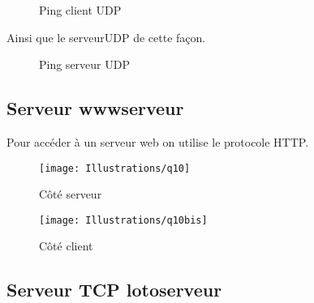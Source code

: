 \documentclass[paper=a4, fontsize=12pt]{article}
\numberwithin{equation}{section}		%
\numberwithin{figure}{section}			%
\numberwithin{table}{section}				%
\begin{document}
\begin{figure}[h!]
\caption{\label{Illustrations/decoupage_etapes_2}Ping client UDP}
\end{figure}
Ainsi que le serveurUDP de cette façon.
\begin{figure}[h!]
\caption{\label{Illustrations/decoupage_etapes_2}Ping serveur UDP}
\end{figure}

\subsection{Serveur wwwserveur}
Pour accéder à un serveur web on utilise le protocole HTTP.
\begin{figure}[h!]
\centerline{\texttt{[image: Illustrations/q10]}}
\caption{\label{Illustrations/q10} Côté serveur}
\end{figure}
\begin{figure}[h!]
\centerline{\texttt{[image: Illustrations/q10bis]}}
\caption{\label{Illustrations/q10bis} Côté client}
\end{figure}
\subsection{Serveur TCP lotoserveur}

\end{document}
